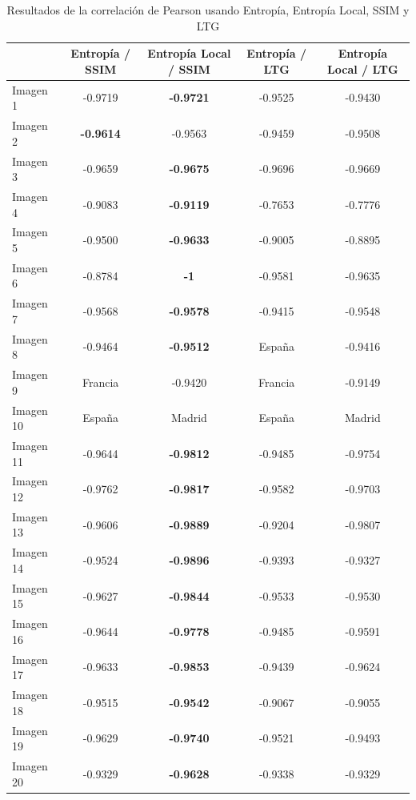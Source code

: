 \documentclass[spanish,twocolumn]{article}
\begin{document}
{\onecolumn
\begin{table}[htbp]
\begin{center}
\begin{tabular}{||l|c|c|c|c|}
\hline
& Entropía / SSIM & Entropía Local / SSIM & Entropía / LTG & Entropía Local / LTG\\
\hline \hline
Imagen 1 & -0.9719 & \textbf{-0.9721} & -0.9525 & -0.9430 \\ \hline
Imagen 2 & \textbf{-0.9614} & -0.9563 & -0.9459 & -0.9508 \\ \hline
Imagen 3 & -0.9659 & \textbf{-0.9675} & -0.9696 & -0.9669 \\ \hline
Imagen 4 & -0.9083 & \textbf{-0.9119} & -0.7653 & -0.7776 \\ \hline
Imagen 5 & -0.9500 & \textbf{-0.9633} & -0.9005 & -0.8895 \\ \hline
Imagen 6 & -0.8784 & \textbf{-1} & -0.9581 & -0.9635 \\ \hline
Imagen 7 & -0.9568 & \textbf{-0.9578} & -0.9415 & -0.9548 \\ \hline
Imagen 8 & -0.9464 & \textbf{-0.9512} & España & -0.9416 \\ \hline
Imagen 9 & Francia & -0.9420 & Francia & -0.9149 \\ \hline
Imagen 10 & España & Madrid & España & Madrid \\ \hline
Imagen 11 & -0.9644 & \textbf{-0.9812} & -0.9485 & -0.9754 \\ \hline
Imagen 12 & -0.9762 & \textbf{-0.9817} & -0.9582 & -0.9703 \\ \hline
Imagen 13 & -0.9606 & \textbf{-0.9889} & -0.9204 & -0.9807 \\ \hline
Imagen 14 & -0.9524 & \textbf{-0.9896} & -0.9393 & -0.9327 \\ \hline
Imagen 15 & -0.9627 & \textbf{-0.9844} & -0.9533 & -0.9530 \\ \hline
Imagen 16 & -0.9644 & \textbf{-0.9778} & -0.9485 & -0.9591 \\ \hline
Imagen 17 & -0.9633 & \textbf{-0.9853} & -0.9439 & -0.9624 \\ \hline
Imagen 18 & -0.9515 & \textbf{-0.9542} & -0.9067 & -0.9055 \\ \hline
Imagen 19 & -0.9629 & \textbf{-0.9740} & -0.9521 & -0.9493 \\ \hline
Imagen 20 & -0.9329 & \textbf{ -0.9628} & -0.9338 & -0.9329 \\ \hline
\end{tabular}
\caption{Resultados de la correlación de Pearson usando Entropía, Entropía Local, SSIM y LTG}
\label{tabla:correlacion}
\end{center}
\end{table}

}
\end{document}
